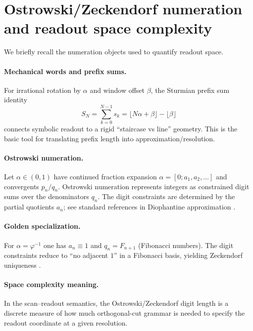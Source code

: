 \section{Ostrowski/Zeckendorf numeration and readout space complexity}
\label{app:ostrowski_zeckendorf}

We briefly recall the numeration objects used to quantify readout space.

\paragraph{Mechanical words and prefix sums.}
For irrational rotation by $\alpha$ and window offset $\beta$, the Sturmian prefix sum identity
\begin{equation}
S_N=\sum_{k=0}^{N-1}s_k=\lfloor N\alpha+\beta\rfloor-\lfloor\beta\rfloor
\end{equation}
connects symbolic readout to a rigid ``staircase vs line'' geometry. This is the basic tool for translating prefix length into approximation/resolution.

\paragraph{Ostrowski numeration.}
Let $\alpha\in(0,1)$ have continued fraction expansion $\alpha=[0;a_1,a_2,\dots]$ and convergents $p_n/q_n$.
Ostrowski numeration represents integers as constrained digit sums over the denominators $q_n$.
The digit constraints are determined by the partial quotients $a_n$; see standard references in Diophantine approximation \cite{Cassels1957,KuipersNiederreiter1974}.

\paragraph{Golden specialization.}
For $\alpha=\varphi^{-1}$ one has $a_n\equiv 1$ and $q_n=F_{n+1}$ (Fibonacci numbers). The digit constraints reduce to ``no adjacent $1$'' in a Fibonacci basis, yielding Zeckendorf uniqueness \cite{Zeckendorf1972}.

\paragraph{Space complexity meaning.}
In the scan--readout semantics, the Ostrowski/Zeckendorf digit length is a discrete measure of how much orthogonal-cut grammar is needed to specify the readout coordinate at a given resolution.
